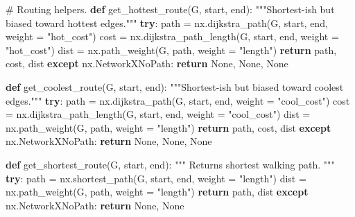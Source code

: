\documentclass[
]{article}
\newenvironment{Shaded}{\begin{snugshade}}{\end{snugshade}}
\newcommand{\CommentTok}[1]{\textcolor[rgb]{0.37,0.37,0.37}{#1}}
\newcommand{\ControlFlowTok}[1]{\textcolor[rgb]{0.00,0.23,0.31}{\textbf{#1}}}
\newcommand{\KeywordTok}[1]{\textcolor[rgb]{0.00,0.23,0.31}{\textbf{#1}}}
\newcommand{\NormalTok}[1]{\textcolor[rgb]{0.00,0.23,0.31}{#1}}
\newcommand{\OperatorTok}[1]{\textcolor[rgb]{0.37,0.37,0.37}{#1}}
\newcommand{\StringTok}[1]{\textcolor[rgb]{0.13,0.47,0.30}{#1}}
\newcommand{\VariableTok}[1]{\textcolor[rgb]{0.07,0.07,0.07}{#1}}
\begin{document}
\begin{Shaded}
\begin{Highlighting}[]
\CommentTok{\# Routing helpers.}
\KeywordTok{def}\NormalTok{ get\_hottest\_route(G, start, end):}
    \CommentTok{"""Shortest{-}ish but biased toward hottest edges."""}
    \ControlFlowTok{try}\NormalTok{:}
\NormalTok{        path }\OperatorTok{=}\NormalTok{ nx.dijkstra\_path(G, start, end, weight }\OperatorTok{=} \StringTok{"hot\_cost"}\NormalTok{)}
\NormalTok{        cost }\OperatorTok{=}\NormalTok{ nx.dijkstra\_path\_length(G, start, end, weight }\OperatorTok{=} \StringTok{"hot\_cost"}\NormalTok{)}
\NormalTok{        dist }\OperatorTok{=}\NormalTok{ nx.path\_weight(G, path, weight }\OperatorTok{=} \StringTok{"length"}\NormalTok{)}
        \ControlFlowTok{return}\NormalTok{ path, cost, dist}
    \ControlFlowTok{except}\NormalTok{ nx.NetworkXNoPath:}
        \ControlFlowTok{return} \VariableTok{None}\NormalTok{, }\VariableTok{None}\NormalTok{, }\VariableTok{None}

\KeywordTok{def}\NormalTok{ get\_coolest\_route(G, start, end):}
    \CommentTok{"""Shortest{-}ish but biased toward coolest edges."""}
    \ControlFlowTok{try}\NormalTok{:}
\NormalTok{        path }\OperatorTok{=}\NormalTok{ nx.dijkstra\_path(G, start, end, weight }\OperatorTok{=} \StringTok{"cool\_cost"}\NormalTok{)}
\NormalTok{        cost }\OperatorTok{=}\NormalTok{ nx.dijkstra\_path\_length(G, start, end, weight }\OperatorTok{=} \StringTok{"cool\_cost"}\NormalTok{)}
\NormalTok{        dist }\OperatorTok{=}\NormalTok{ nx.path\_weight(G, path, weight }\OperatorTok{=} \StringTok{"length"}\NormalTok{)}
        \ControlFlowTok{return}\NormalTok{ path, cost, dist}
    \ControlFlowTok{except}\NormalTok{ nx.NetworkXNoPath:}
        \ControlFlowTok{return} \VariableTok{None}\NormalTok{, }\VariableTok{None}\NormalTok{, }\VariableTok{None}

\KeywordTok{def}\NormalTok{ get\_shortest\_route(G, start, end):}
    \CommentTok{"""}
\CommentTok{    Returns shortest walking path.}
\CommentTok{    """}
    \ControlFlowTok{try}\NormalTok{:}
\NormalTok{        path }\OperatorTok{=}\NormalTok{ nx.shortest\_path(G, start, end, weight }\OperatorTok{=} \StringTok{"length"}\NormalTok{)}
\NormalTok{        dist }\OperatorTok{=}\NormalTok{ nx.path\_weight(G, path, weight }\OperatorTok{=} \StringTok{"length"}\NormalTok{)}
        \ControlFlowTok{return}\NormalTok{ path, dist}
    \ControlFlowTok{except}\NormalTok{ nx.NetworkXNoPath:}
        \ControlFlowTok{return} \VariableTok{None}\NormalTok{, }\VariableTok{None}
\end{Highlighting}
\end{Shaded}
\end{document}
